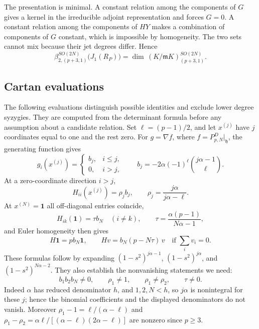 \documentclass[10pt,reqno]{amsart}
\numberwithin{equation}{section}
\theoremstyle{plain}
\theoremstyle{definition}
\begin{document}
The presentation is minimal. A constant relation among the components of $G$ gives a kernel in the irreducible adjoint representation and forces $G=0$. A constant relation among the components of $HY$ makes a combination of components of $G$ constant, which is impossible by homogeneity. The two sets cannot mix because their jet degrees differ. Hence
\begin{equation*}
\beta^{SO(2N)}_{2,(p+3,1)}\big(J_1(R_P)\big)=\dim\,(K/\mathfrak{m} K)^{SO(2N)}_{(p+3,1)} .
\end{equation*}

\subsection{Cartan evaluations}\label{sec:evals}

The following evaluations distinguish possible identities and exclude lower degree syzygies. They are computed from the determinant formula before any assumption about a candidate relation. Set $\ell=(p-1)/2$, and let $x^{(j)}$ have $j$ coordinates equal to one and the rest zero. For $g=\nabla f$, where $f=P^D_{p,N}|_\mathfrak{h}$, the generating function gives
\begin{equation*}
	g_i(x^{(j)})=\begin{cases}b_j,&i\le j,\\0,&i>j,\end{cases}\qquad b_j=-2\alpha(-1)^\ell\binom{j\alpha-1}{\ell}.
\end{equation*}
At a zero-coordinate direction $i>j$,
\begin{equation}\label{eq:evals-rho}
	H_{ii}(x^{(j)})=\rho_jb_j,\qquad \rho_j=\frac{j\alpha}{j\alpha-\ell}.
\end{equation}
At $x^{(N)}=\mathbf 1$ all off-diagonal entries coincide,
\begin{equation*}
	H_{ik}(\mathbf 1)=\tau b_N\quad(i\neq k),\qquad \tau=\frac{\alpha(p-1)}{N\alpha-1},
\end{equation*}
and Euler homogeneity then gives
\begin{equation}\label{eq:evals-euler}
	H\mathbf 1=pb_N\mathbf 1,\qquad Hv=b_N(p-N\tau)\,v\quad\text{if }\textstyle\sum_iv_i=0 .
\end{equation}
These formulas follow by expanding $(1-s^2)^{j\alpha-1}$, $(1-s^2)^{j\alpha}$, and $(1-s^2)^{N\alpha-2}$. They also establish the nonvanishing statements we need:
\begin{equation*}
	b_1b_2b_N\neq0,\qquad \rho_1\neq1,\qquad \rho_1\neq\rho_2,\qquad \tau\neq0 .
\end{equation*}
Indeed $\alpha$ has reduced denominator $h$, and $1,2,N<h$, so $j\alpha$ is nonintegral for these $j$; hence the binomial coefficients and the displayed denominators do not vanish. Moreover $\rho_1-1=\ell/(\alpha-\ell)$ and $\rho_1-\rho_2=\alpha\ell/[(\alpha-\ell)(2\alpha-\ell)]$ are nonzero since $p\ge3$.
\end{document}
